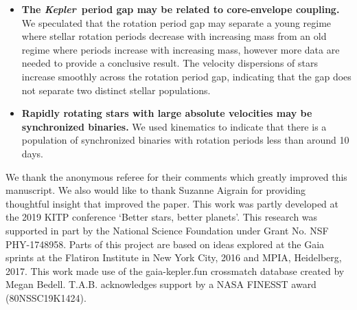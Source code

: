 \documentclass{aastex63}
\newcommand{\kepler}{{\it Kepler}}
\newcommand{\vz}{$v_{\bf z}$}
\newcommand{\vb}{$v_{\bf b}$}
\newcommand{\sigmavb}{$\sigma_{v{\bf b}}$}
\begin{document}
\begin{itemize}
\item{{\bf The \kepler\ period gap may be related to core-envelope coupling.}
We speculated that the rotation period gap \citep{mcquillan2014} may separate
a young regime where stellar rotation periods decrease with increasing mass
from an old regime where periods increase with increasing mass, however more
data are needed to provide a conclusive result.
The velocity dispersions of stars increase smoothly across the rotation period
gap, indicating that the gap does not separate two distinct stellar
populations.}

\item{{\bf Rapidly rotating stars with large absolute velocities may be
synchronized binaries.}
We used kinematics to indicate that there is a population of
synchronized binaries with rotation periods less than around 10 days.}


\end{itemize}

We thank the anonymous referee for their comments which greatly improved this
manuscript.
We also would like to thank Suzanne Aigrain for providing thoughtful insight
that improved the paper.
This work was partly developed at the 2019 KITP conference `Better stars,
better planets'.
This research was supported in part by the National Science Foundation under
Grant No. NSF PHY-1748958.
Parts of this project are based on ideas explored at the Gaia sprints at the
Flatiron Institute in New York City, 2016 and MPIA, Heidelberg, 2017.
This work made use of the gaia-kepler.fun crossmatch database created by Megan
Bedell.
T.A.B. acknowledges support by a NASA FINESST award (80NSSC19K1424).
\end{document}
